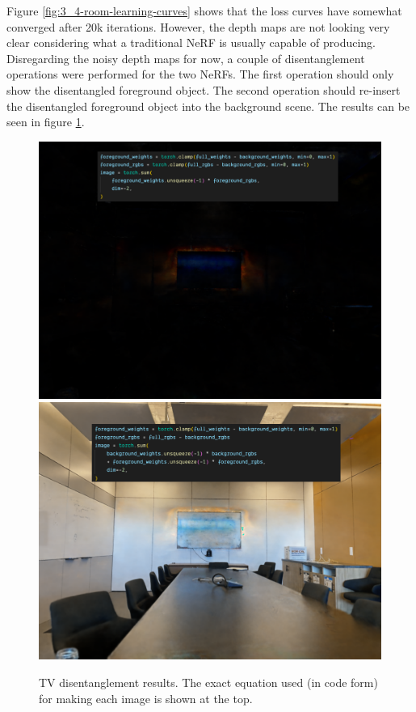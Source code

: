 Figure \ref{fig:3_4-room-learning-curves} shows that the loss curves have somewhat converged after 20k iterations. However, the depth maps are not looking very clear considering what a traditional NeRF is usually capable of producing.
Disregarding the noisy depth maps for now, a couple of disentanglement operations were performed for the two NeRFs. The first operation should only show the disentangled foreground object. The second operation should re-insert the disentangled foreground object into the background scene. The results can be seen in figure \ref{fig:3_4-room-disentanglement}.
\begin{figure}[H]
    \centering
    \includegraphics[width=1.0\textwidth]{figures/3_4-room-fg.png}
    \includegraphics[width=1.0\textwidth]{figures/3_4-room-recombined-no-rgbclamp.png}

    \caption{TV disentanglement results. The exact equation used (in code form) for making each image is shown at the top.}
    \label{fig:3_4-room-disentanglement}
\end{figure}

